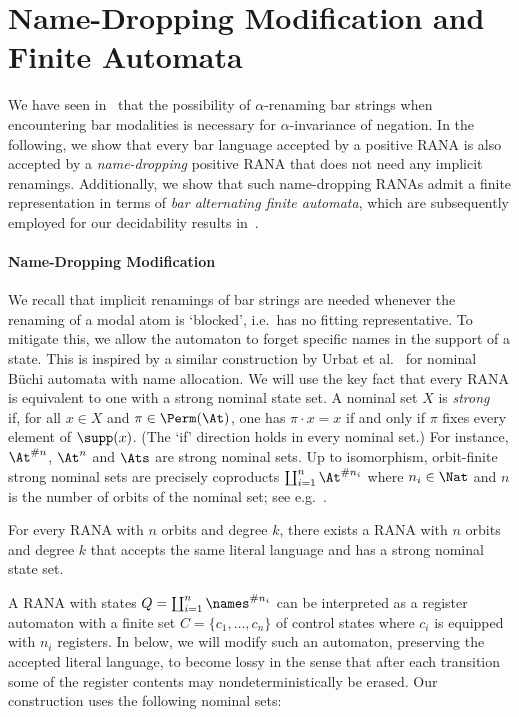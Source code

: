 \documentclass[10pt, final, conference, a4paper, twocolumn]{IEEEtran}
\renewcommand{\enquote}[1]{`#1'}
\begin{document}
\section{Name-Dropping Modification and Finite Automata}\label{subsec:name-dropping}

We have seen in~ that the possibility
of $\alpha$-renaming bar strings when encountering bar modalities is necessary for
$\alpha$-invariance of negation.
In the following, we show that every bar language accepted by a positive RANA is also
accepted by a \emph{name-dropping} positive RANA that does not need any implicit renamings.
Additionally, we show that such name-dropping RANAs admit a finite representation in terms
of \emph{bar alternating finite automata}, which are subsequently employed for our decidability
results in~.

\paragraph*{Name-Dropping Modification} We recall that implicit renamings of bar strings
are needed whenever the renaming of a modal atom is \enquote{blocked}, i.e.~has no fitting representative.
To mitigate this, we allow the automaton to forget specific names in the support of a state. This is inspired by a similar construction by Urbat et
al.~\cite{uhms21} for nominal Büchi automata with name allocation. We will use the key fact that every RANA is equivalent to one with a strong
nominal state set.
A nominal set $X$ is \emph{strong}~\cite{Tzevelekos07} if, for all $x\in X$
and $\pi\in \Perm(\At)$, one has $\pi\cdot x = x$ if and only if $\pi$
fixes every element of $\supp(x)$.  (The `if' direction holds in every
nominal set.)  For instance, $\At^{\#n}$, $\At^n$ and
$\Ats$ are strong nominal sets.  Up to isomorphism, orbit-finite strong nominal
sets are precisely coproducts $\coprod_{i=1}^n \At^{\# n_i}$
where $n_i\in \Nat$ and $n$ is the number of orbits of
the nominal set; see e.g.~\cite[Cor.~B.27]{mil-urb-19}.

\begin{theo}\label{thm:representation}
  For every RANA with $n$ orbits and degree $k$, there exists a RANA with $n$ orbits and degree $k$
  that accepts the same literal language and has a strong nominal state set.
\end{theo}


A RANA with states $Q = \coprod_{i=1}^n \names^{\# n_i}$ can be interpreted as a register automaton with a finite set $C=\{c_1,\ldots,c_n\}$ of control states where $c_i$ is equipped with $n_i$ registers.
In  below, we will modify such an automaton, preserving the accepted literal language, to become lossy in the sense that after each transition some of the
register contents may nondeterministically be erased. Our construction uses the following nominal sets:
\end{document}

